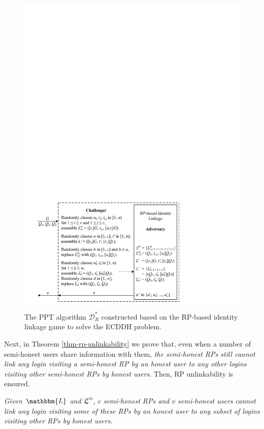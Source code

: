 \begin{figure}[tb]
  \centering
  \includegraphics[width=1.0\linewidth]{fig/rp-linkage-game.pdf}
  \caption{The PPT algorithm $\mathcal{D}^*_R$ constructed based on the RP-based identity linkage game to solve the ECDDH problem.}
  \label{fig:dalgorithm}
\end{figure}

Next, in Theorem \ref{thm-rp-unlinkability} we prove that, 
even when a number of semi-honest users share information with them,
\emph{the semi-honest RPs still cannot link any login visiting a semi-honest RP by an honest user to any other logins visiting other semi-honest RPs by honest users}.
Then, RP unlinkability is ensured.

\vspace{1.5mm}
\begin{thm}[RP Unlinkability]
\emph{Given $\mathbbm{L}$ and $\mathfrak{L}^m$, $c$ semi-honest RPs and $v$ semi-honest users cannot link any login visiting some of these RPs by an honest user to any subset of logins visiting other RPs by honest users.}
\label{thm-rp-unlinkability}
\end{thm}

